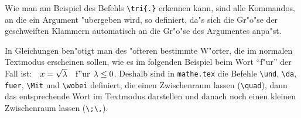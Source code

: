 Wie man am Beispiel des Befehls \verb+\tri{.}+ erkennen kann, sind
alle Kommandos, an die ein Argument "ubergeben wird, so definiert,
da"s sich die Gr"o"se der geschweiften Klammern automatisch an die 
Gr"o"se des Argumentes anpa"st.

In Gleichungen ben"otigt man des "ofteren bestimmte W"orter, die im
normalen Textmodus erscheinen sollen, wie es im folgenden Beispiel 
beim Wort ``f"ur'' der Fall ist:\ \ $x=\sqrt{\lambda} \quad\mathrm{f"ur}\;\, \lambda\leq 0$.
Deshalb sind in {\tt mathe.tex} die Befehle \verb+\und+, 
\verb+\da+, \verb+fuer+, \verb+\Mit+ und \verb+\wobei+ 
definiert, die einen Zwischenraum lassen (\verb+\quad+), dann das entsprechende
Wort im Textmodus darstellen und danach noch einen kleinen Zwischenraum lassen 
(\verb+\;\,+).

